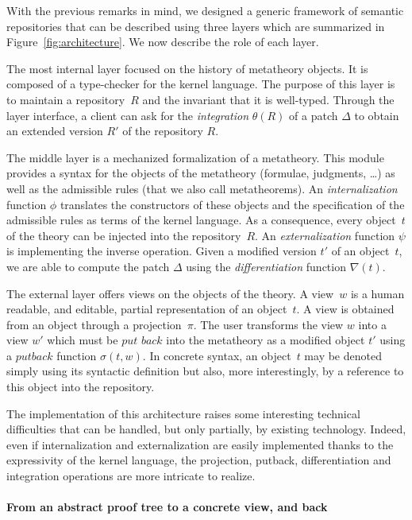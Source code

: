 With the previous remarks in mind, we designed a generic framework of semantic
repositories that can be described using three layers which are summarized in 
Figure~\ref{fig:architecture}. We now describe the role of each layer.

The most internal layer focused on the history of metatheory
objects. It is composed of a type-checker for the kernel language. The
purpose of this layer is to maintain a repository~$R$ and the
invariant that it is well-typed. Through the layer interface, a client
can ask for the \textit{integration} $\theta(R)$ of a patch $\Delta$
to obtain an extended version $R'$ of the repository $R$.

The middle layer is a mechanized formalization of a metatheory. This
module provides a syntax for the objects of the metatheory (formulae,
judgments, \ldots) as well as the admissible rules (that we also call
metatheorems).  An \textit{internalization} function $\phi$ translates
the constructors of these objects and the specification of the
admissible rules as terms of the kernel language. As a consequence,
every object~$t$ of the theory can be injected into the
repository~$R$. An \textit{externalization} function $\psi$ is
implementing the inverse operation. Given a modified version $t'$ of
an object~$t$, we are able to compute the patch $\Delta$ using
the \textit{differentiation} function $\nabla(t)$. 

The external layer offers views on the objects of the theory. A
view~$w$ is a human readable, and editable, partial representation of
an object~$t$. A view is obtained from an object through a
projection~$\pi$.  The user transforms the view $w$ into a view $w'$
which must be $\textit{put back}$ into the metatheory as a modified
object $t'$ using a $\textit{putback}$ function $\sigma(t, w)$.  In
concrete syntax, an object~$t$ may be denoted simply using its
syntactic definition but also, more interestingly, by a reference to this 
object into the repository.

The implementation of this architecture raises some interesting
technical difficulties that can be handled, but only partially, 
by existing technology. Indeed, even if internalization and 
externalization are easily implemented thanks to the expressivity
of the kernel language, the projection, putback, differentiation
and integration operations are more intricate to realize. 

\paragraph{From an abstract proof tree to a concrete view, and back}
\-

